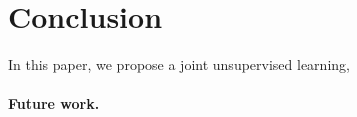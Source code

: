\section{Conclusion} 
In this paper, we propose a joint unsupervised learning, 

\paragraph{Future work.}
